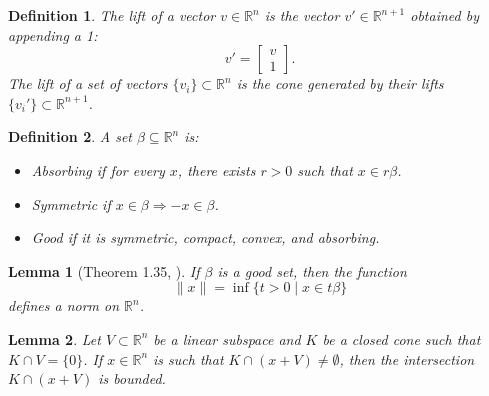 \documentclass{article}
\newtheorem{lem}{Lemma}
\newtheorem{define}{Definition}
\begin{document}
\begin{define}
The \textit{lift} of a vector \( v \in \mathbb{R}^n \) is the vector \( v' \in \mathbb{R}^{n+1} \) obtained by appending a 1:
\[
v' = \begin{bmatrix} v \\ 1 \end{bmatrix}.
\]
The \textit{lift} of a set of vectors \( \{v_i\} \subset \mathbb{R}^n \) is the cone generated by their lifts \( \{v_i'\} \subset \mathbb{R}^{n+1} \).
\end{define}



\begin{define}
A set \( \beta \subseteq \mathbb{R}^n \) is:
\begin{itemize}
    \item \textit{Absorbing} if for every \( x \), there exists \( r > 0 \) such that \( x \in r \beta \).
    \item \textit{Symmetric} if \( x \in \beta \Rightarrow -x \in \beta \).
    \item \textit{Good} if it is symmetric, compact, convex, and absorbing.
\end{itemize}
\end{define}

\begin{lem}[Theorem 1.35, \cite{rudin1973functional}]
\label{lem:good set to norm}
   If $\beta$ is a good set, then the function
   \[
   \|x\| = \inf\{t>0 \mid x \in t \beta \}
   \]
   defines a norm on $\mathbb{R}^n$.
\end{lem}












\begin{lem}
\label{lem:transversal cones bounded section}
Let \( V \subset \mathbb{R}^n \) be a linear subspace and $K$ be a closed cone such that \( K \cap V = \{0\} \). If \( x \in \mathbb{R}^n \) is such that \( K \cap (x + V) \neq \emptyset \), then the intersection \( K \cap (x + V) \) is bounded.
\end{lem}
\end{document}
